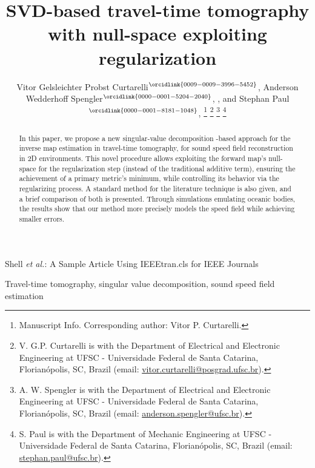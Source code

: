 \title{SVD-based travel-time tomography with null-space exploiting regularization}

\author{%
	Vitor Gelsleichter Probst Curtarelli$^{\orcidlink{0009-0009-3996-5452}}$, Anderson Wedderhoff Spengler$^{\orcidlink{0000-0001-5204-2040}}$, , and Stephan Paul$^{\orcidlink{0000-0001-8181-1048}}$, 
	\thanks{\ieee Manuscript Info. Corresponding author: Vitor P. Curtarelli.}%
	\thanks{V. G.P. Curtarelli is with the Department of Electrical and Electronic Engineering at UFSC - Universidade Federal de Santa Catarina, Florianópolis, SC, Brazil (email: \url{vitor.curtarelli@posgrad.ufsc.br}).}%
	\thanks{A. W. Spengler is with the Department of Electrical and Electronic Engineering at UFSC - Universidade Federal de Santa Catarina, Florianópolis, SC, Brazil (email: \url{anderson.spengler@ufsc.br}).}%
	\thanks{S. Paul is with the Department of Mechanic Engineering at UFSC - Universidade Federal de Santa Catarina, Florianópolis, SC, Brazil (email: \url{stephan.paul@ufsc.br}).}%
}

%
{Shell \MakeLowercase{\textit{et al.}}: A Sample Article Using IEEEtran.cls for IEEE Journals}


\maketitle

\begin{abstract}	
	In this paper, we propose a new singular-value decomposition -based approach for the inverse map estimation in travel-time tomography, for sound speed field reconstruction in 2D environments. This novel procedure allows exploiting the forward map's null-space for the regularization step (instead of the traditional additive term), ensuring the achievement of a primary metric's minimum, while controlling its behavior via the regularizing process. A standard method for the literature technique is also given, and a brief comparison of both is presented. Through simulations emulating oceanic bodies, the results show that our method more precisely models the speed field while achieving smaller errors.
\end{abstract}

\begin{IEEEkeywords}
	Travel-time tomography, singular value decomposition, sound speed field estimation
\end{IEEEkeywords}